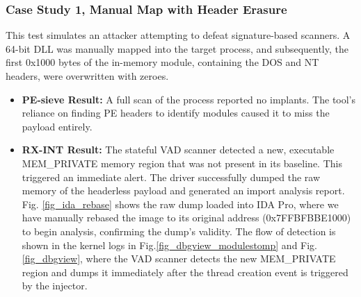 \documentclass[journal]{IEEEtran}
\begin{document}
\subsubsection{Case Study 1, Manual Map with Header Erasure}
This test simulates an attacker attempting to defeat signature-based scanners. A 64-bit DLL was manually mapped into the target process, and subsequently, the first 0x1000 bytes of the in-memory module, containing the DOS and NT headers, were overwritten with zeroes.
\begin{itemize}
\item \textbf{PE-sieve Result:} A full scan of the process reported no implants. The tool's reliance on finding PE headers to identify modules caused it to miss the payload entirely.
\item \textbf{RX-INT Result:} The stateful VAD scanner detected a new, executable MEM\_PRIVATE memory region that was not present in its baseline. This triggered an immediate alert. The driver successfully dumped the raw memory of the headerless payload and generated an import analysis report. Fig. \ref{fig_ida_rebase} shows the raw dump loaded into IDA Pro, where we have manually rebased the image to its original address (0x7FFBFBBE1000) to begin analysis, confirming the dump's validity. The flow of detection is shown in the kernel logs in Fig.\ref{fig_dbgview_modulestomp} and Fig. \ref{fig_dbgview}, where the VAD scanner detects the new MEM\_PRIVATE region and dumps it immediately after the thread creation event is triggered by the injector.
\end{itemize}
\end{document}

